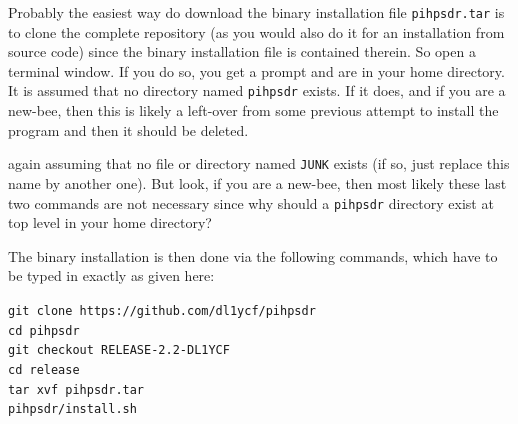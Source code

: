 \documentclass[12pt]{book}
\def\grtt#1{\texttt{\color{magenta}#1}}
\begin{document}
\begin{center}
\end{center}
Probably the easiest way do download the binary installation file \texttt{pihpsdr.tar} is to clone
the complete repository (as you would also do it for an installation from source code) since the
binary installation file is contained therein. So open a terminal window. If you do so, you get
a prompt and are in your home directory. It is assumed that no directory named \texttt{pihpsdr}
exists. If it does, and if you are a new-bee, then this is likely a left-over from some previous
attempt to install the program and then it should be deleted.

again assuming that no file or directory named \texttt{JUNK} exists (if so, just replace this
name by another one). But look, if you are a new-bee, then most likely these last two commands
are not necessary since why should a \texttt{pihpsdr} directory exist at top level in your
home directory?

The binary installation
is then done via the following commands, which have to be typed in exactly as given here:

\grtt{git clone https://github.com/dl1ycf/pihpsdr} \\
\grtt{cd pihpsdr} \\
\grtt{git checkout RELEASE-2.2-DL1YCF} \\
\grtt{cd release} \\
\grtt{tar xvf pihpsdr.tar} \\
\grtt{pihpsdr/install.sh} \\

\begin{center}
\end{center}
\end{document}
